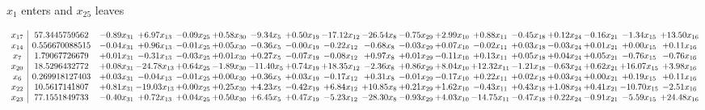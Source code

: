 \documentclass[9pt]{article}
\begin{document}
 $ x_{1} $ enters and $ x_{25} $ leaves 

 \[\begin{array}{c| c c@{\hskip 2pt} c@{\hskip 2pt} c@{\hskip 2pt} c@{\hskip 2pt} c@{\hskip 2pt} c@{\hskip 2pt} c@{\hskip 2pt} c@{\hskip 2pt} c@{\hskip 2pt} c@{\hskip 2pt} c@{\hskip 2pt} c@{\hskip 2pt} c@{\hskip 2pt} c@{\hskip 2pt} c@{\hskip 2pt} c@{\hskip 2pt} }
 x_{17}   &  57.3445759562 & -0.89 x_{31} & +  6.97 x_{13} & -0.09 x_{25} & +  0.58 x_{30} & -9.34 x_{5} & +  0.50 x_{19} & -17.12 x_{12} & -26.54 x_{8} & -0.75 x_{29} & +  2.99 x_{10} & +  0.88 x_{11} & -0.45 x_{18} & +  0.12 x_{24} & -0.16 x_{21} & -1.34 x_{15} & + 13.50 x_{16}\\
 x_{14}   &  0.556670088515 & -0.04 x_{31} & +  0.96 x_{13} & -0.01 x_{25} & +  0.05 x_{30} & -0.36 x_{5} & -0.00 x_{19} & -0.22 x_{12} & -0.68 x_{8} & -0.03 x_{29} & +  0.07 x_{10} & -0.02 x_{11} & +  0.03 x_{18} & -0.03 x_{24} & +  0.01 x_{21} & +  0.00 x_{15} & +  0.11 x_{16}\\
 x_{7}   &  1.79067726679 & +  0.01 x_{31} & -0.31 x_{13} & -0.03 x_{25} & +  0.01 x_{30} & +  0.27 x_{5} & -0.07 x_{19} & -0.08 x_{12} & +  0.97 x_{8} & +  0.01 x_{29} & -0.11 x_{10} & +  0.13 x_{11} & +  0.05 x_{18} & +  0.04 x_{24} & +  0.05 x_{21} & -0.76 x_{15} & -0.76 x_{16}\\
 x_{20}   &  18.5296432772 & +  0.08 x_{31} & -24.78 x_{13} & +  0.64 x_{25} & -1.89 x_{30} & -11.40 x_{5} & +  0.74 x_{19} & + 18.35 x_{12} & -2.36 x_{8} & +  0.86 x_{29} & +  8.04 x_{10} & + 12.32 x_{11} & -1.21 x_{18} & -0.63 x_{24} & +  0.62 x_{21} & + 16.07 x_{15} & +  3.98 x_{16}\\
 x_{6}   &  0.269918127403 & +  0.03 x_{31} & -0.04 x_{13} & -0.01 x_{25} & +  0.00 x_{30} & +  0.36 x_{5} & +  0.03 x_{19} & -0.17 x_{12} & +  0.31 x_{8} & -0.01 x_{29} & -0.17 x_{10} & +  0.22 x_{11} & +  0.02 x_{18} & +  0.03 x_{24} & +  0.00 x_{21} & +  0.19 x_{15} & +  0.11 x_{16}\\
 x_{22}   &  10.5617141807 & +  0.81 x_{31} & -19.03 x_{13} & +  0.00 x_{25} & +  0.25 x_{30} & +  4.23 x_{5} & -0.42 x_{19} & +  6.84 x_{12} & + 10.85 x_{8} & +  0.21 x_{29} & +  1.62 x_{10} & -0.43 x_{11} & +  0.43 x_{18} & +  1.08 x_{24} & +  0.41 x_{21} & -10.70 x_{15} & -2.51 x_{16}\\
 x_{23}   &  77.1551849733 & -0.40 x_{31} & +  0.72 x_{13} & +  0.04 x_{25} & +  0.50 x_{30} & +  6.45 x_{5} & +  0.47 x_{19} & -5.23 x_{12} & -28.30 x_{8} & -0.93 x_{29} & +  4.03 x_{10} & -14.75 x_{11} & -0.47 x_{18} & +  0.22 x_{24} & -0.91 x_{21} & -5.59 x_{15} & + 24.48 x_{16}\\

\end{array}\]
\end{document}
